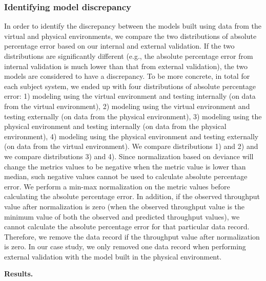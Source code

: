 \documentclass[smallextended]{svjour3}       %
\begin{document}
\subsubsection{Identifying model discrepancy}
In order to identify the discrepancy between the models built using data from the virtual and physical environments, we compare the two distributions of absolute percentage error based on our internal and external validation. If the two distributions are significantly different (e.g., the absolute percentage error from internal validation is much lower than that from external validation), the two models are considered to have a discrepancy. To be more concrete, in total for each subject system, we ended up with four distributions of absolute percentage error: 1) modeling using the virtual environment and testing internally (on data from the virtual environment), 2) modeling using the virtual environment and testing externally (on data from the physical environment), 3) modeling using the physical environment and testing internally (on data from the physical environment), 4) modeling using the physical environment and testing externally (on data from the virtual environment). We compare distributions 1) and 2) and we compare distributions 3) and 4). Since normalization based on deviance will change the metrics values to be negative when the metric value is lower than median, such negative values cannot be used to calculate absolute percentage error. We perform a min-max normalization on the metric values before calculating the absolute percentage error. In addition, if the observed throughput value after normalization is zero (when the observed throughput value is the minimum value of both the observed and predicted throughput values), we cannot calculate the absolute percentage error for that particular data record. Therefore, we remove the data record if the throughput value after normalization is zero. In our case study, we only removed one data record when performing external validation with the model built in the physical environment. 


\noindent \textbf{Results.}
\end{document}
